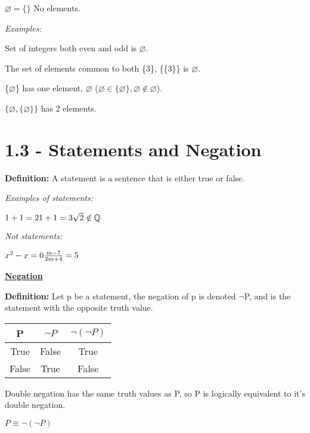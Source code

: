 \documentclass[11pt]{article}
\begin{document}
    $\varnothing = \{\}$ No elements.
    \medskip

    \textit{Examples:}

    Set of integers both even and odd is $\varnothing$.

    The set of elements common to both \{3\}, \{\{3\}\} is $\varnothing$.

    \{$\varnothing$\} has one element, $\varnothing$ ($\varnothing \in \{\varnothing\}, \varnothing \notin \varnothing$).

    $\{\varnothing, \{\varnothing\}\}$ has 2 elements.

\section*{1.3 - Statements and Negation}

    \textbf{Definition: } A statement is a sentence that is either true or false.

    \textit{Examples of statements: }
    
    $1+1=2\\1+1=3\\\sqrt{2} \notin \mathbb{Q}$
    \medskip

    \textit{Not statements:}

    $x^2-x=0\\\frac{m-7}{2m+4}=5$
    \bigskip

    \underline{\textbf{Negation}}

    \textbf{Definition: }Let p be a statement, the negation of p is denoted $\neg$P, and is the statement with the opposite truth value.

    \begin{center}
        \begin{tabular}{ |c|c|c| } 
            \hline
            P & $\neg P$ & $\neg(\neg P)$ \\ 
            \hline
            True & False & True \\ 
            False & True & False \\ 
            \hline
        \end{tabular}
    \end{center}
    
    Double negation has the same truth values as P, so P is logically equivalent to it's double negation.
    
    \begin{center}
        \underline{$P\equiv\neg (\neg P)$}
    \end{center}
    \medskip
\end{document}
